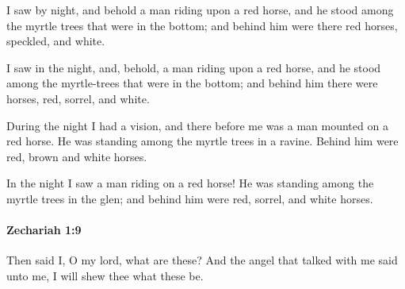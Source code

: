 			I saw by night, and behold a man riding upon a red horse, and he stood among the myrtle trees that were in the bottom; and behind him were there red horses, speckled, and white.

			\begin{versebox}
					\item[BHS] 
					\item[LXX] 
					\item[ASV] I saw in the night, and, behold, a man riding upon a red horse, and he stood among the myrtle-trees that were in the bottom; and behind him there were horses, red, sorrel, and white.
					\item[NIV] During the night I had a vision, and there before me was a man mounted on a red horse. He was standing among the myrtle trees in a ravine. Behind him were red, brown and white horses.
					\item[NRSV] In the night I saw a man riding on a red horse! He was standing among the myrtle trees in the glen; and behind him were red, sorrel, and white horses.
			\end{versebox}

		\paragraph{Zechariah 1:9} %
			\label{ZECHARIAH-1-9}

			Then said I, O my lord, what are these? And the angel that talked with me said unto me, I will shew thee what these be.

